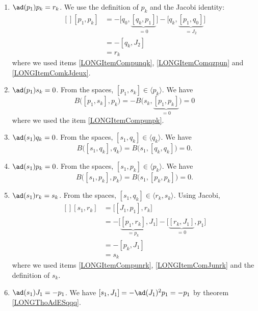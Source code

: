 \begin{enumerate}
	\item$\ad(p_1)p_k=r_k$\label{LONGItemCompunpk}. We use the definition of $p_k$ and the Jacobi identity:
		\begin{equation}
			\begin{aligned}[]
				[p_1,p_k]&=-\big[ q_0,\underbrace{[q_k,p_1]}_{=0} \big]-\big[ q_k,\underbrace{[p_1,q_0]}_{=J_2} \big]\\
					&=-[q_k,J_2]\\
					&=r_k
			\end{aligned}
		\end{equation}
		where we used items \ref{LONGItemCompunqk}, \ref{LONGItemComqzpun} and \ref{LONGItemComkJdeux}.
	\item$\ad(p_1)s_k=0$. From the spaces, $[p_1,s_k]\in\langle p_k\rangle$. We have
		\begin{equation}
			B\big( [p_1,s_k],p_k \big)=-B\big( s_k,\underbrace{[p_1,p_k]}_{=0} \big)=0
		\end{equation}
		where we used the item \ref{LONGItemCompunpk}.
	\item$\ad(s_1)q_k=0$. From the spaces, $[s_1,q_k]\in\langle q_k\rangle$. We have
		\begin{equation}
			B\big( [s_1,q_k],q_k \big)=B\big( s_1,[q_k,q_k] \big)=0.
		\end{equation}
	\item$\ad(s_1)p_k=0$\label{LONGItemComsunpk}. From the spaces, $[s_1,p_k]\in\langle p_k\rangle$. We have
		\begin{equation}
			B\big( [s_1,p_k],p_k \big)=B\big( s_1,[p_k,p_k] \big)=0.
		\end{equation}
	\item$\ad(s_1)r_k=s_k$. From the spaces, $[s_1,q_k]\in\langle r_k,s_k\rangle$. Using Jacobi,
		\begin{equation}
			\begin{aligned}[]
				[s_1,r_k]&=\big[ [J_1,p_1],r_k \big]\\
				&=-\big[ \underbrace{[p_1,r_k]}_{=p_k},J_1 \big]-\big[ \underbrace{[r_k,J_1]}_{=0},p_1 \big]\\
					&=-[p_k,J_1]\\
					&=s_k
			\end{aligned}
		\end{equation}
		where we used items \ref{LONGItemCompunrk}, \ref{LONGItemComJunrk} and the definition of $s_k$.
	\item$\ad(s_1)J_1=-p_1$\label{LONGItemComsunJun}. We have $[s_1,J_1]=-\ad(J_1)^2p_1=-p_1$ by theorem \ref{LONGThoAdESqqq}.

\end{enumerate}
